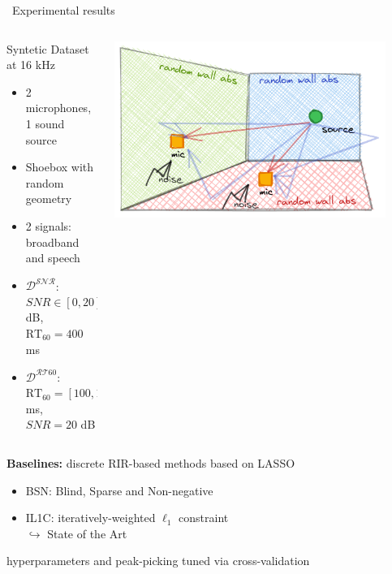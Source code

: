 \begin{frame}[t]{\faFlask~Experimental results \hfill\faJediOrder}

    \begin{columns}[onlytextwidth]
        \begin{column}{0.50\textwidth}
            \begin{block}{Syntetic Dataset at 16 kHz}
                \small
                \begin{itemize}
                    \item 2 microphones, 1 sound source
                    \item Shoebox with random geometry
                    \item 2 signals: broadband and speech
                    \item $\mathcal{D^{\text{SNR}}}$: $SNR \in [0, 20]$ dB, $\text{RT}_{60} = 400$ ms
                    \item $\mathcal{D^{\text{RT60}}}$: $\text{RT}_{60} = [100, 1000]$ ms, $SNR = 20$ dB
                \end{itemize}
            \end{block}
        \end{column}

        \begin{column}{0.45\textwidth}
            \includegraphics[width=0.9\textwidth]{figures/aer_scenario4.png}
        \end{column}
    \end{columns}

    \begin{mysotablock}

        \textbf{Baselines:} discrete RIR-based methods based on LASSO
        \begin{itemize}
            \item BSN: Blind, Sparse and Non-negative \cite{lin2007blind}
            \item IL1C: iteratively-weighted $\ell_1$ constraint~\cite{crocco2015room}
            \\\hspace{.3em} $\hookrightarrow$ State of the Art
        \end{itemize}
        {\footnotesize \hfill hyperparameters and peak-picking tuned via cross-validation}
    \end{mysotablock}


\end{frame}
